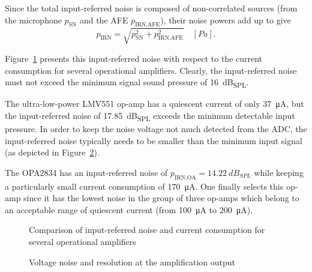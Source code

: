 \documentclass{EPL-master-thesis-covers-EN}
\newcommand{\te}[1]{\textrm{#1}}
\begin{document}

Since the total input-referred noise is composed of non-correlated sources (from the microphone $p_{\te{SN}}$ and the AFE $ p_\te{IRN,AFE}$), their noise powers add up to give
\[
 p_\te{IRN} = \sqrt{p_{\te{SN}}^2 + p_\te{IRN,AFE}^2} \quad \si{[Pa]}.
\]

Figure~\ref{fig:output_noise_op_amp} presents this input-referred noise with respect to the current consumption for several operational amplifiers. Clearly, the input-referred noise must not exceed the minimum signal sound pressure of \SI{16}{dB_{SPL}}.

The ultra-low-power LMV551 op-amp has a quiescent current of only \SI{37}{\micro A}, but the input-referred noise of \SI{17.85}{dB_{SPL}} exceeds the minimum detectable input pressure.
In order to keep the noise voltage not much detected from the ADC, the input-referred noise typically needs to be smaller than the minimum input signal (as depicted in Figure~\ref{fig:ADC_res_noise}).

The OPA2834 has an input-referred noise of $p_\te{IRN,OA} = \SI{14.22}{dB_{SPL}}$ while keeping a particularly small current consumption of \SI{170}{\micro A}. One finally selects this op-amp since it has the lowest noise in the group of three op-amps which belong to an acceptable range of quiescent current (from \SI{100}{\micro A} to \SI{200}{\micro A}).

\begin{figure}[H]
    \centering
    
    \caption{Comparison of input-referred noise and current consumption for several operational amplifiers}
    \label{fig:output_noise_op_amp}
\end{figure}

\begin{figure}[H]
\centering
{}
\caption{Voltage noise and resolution at the amplification output}
\label{fig:ADC_res_noise}
\end{figure}
\end{document}
